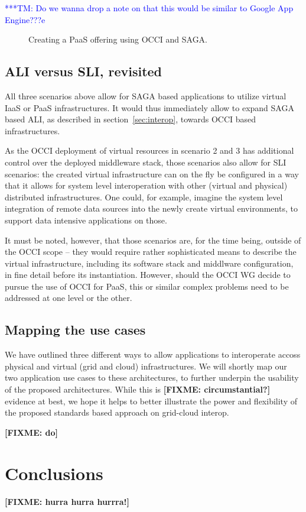 \documentclass[10pt,conference,final,letterpaper,twoside,twocolumn,]{IEEEtran}
\newcommand{\tmnote}[1]{  {\textcolor{blue}    {***TM: #1}}}
\newcommand{\tmnote}[1]{}
\newcommand{\B}[1]{\textbf{#1}}
\newcommand{\F}[1]{\B{[FIXME: #1]}}
\begin{document}
\tmnote{Do we wanna drop a note on that this would be similar to
  Google App Engine???e}

\begin{figure}[htb]
 \caption{\label{fig:arch3} Creating a PaaS offering using OCCI and SAGA.}
\end{figure}

 \subsection{ALI versus SLI, revisited}

 All three scenarios above allow for SAGA based applications to
 utilize virtual IaaS or PaaS infrastructures.  It would thus
 immediately allow to expand SAGA based ALI, as described in
 section~\ref{sec:interop}, towards OCCI based infrastructures.

 As the OCCI deployment of virtual resources in scenario 2 and 3 has
 additional control over the deployed middleware stack, those
 scenarios also allow for SLI scenarios: the created virtual
 infrastructure can on the fly be configured in a way that it allows
 for system level interoperation with other (virtual and physical)
 distributed infrastructures.  One could, for example, imagine the
 system level integration of remote data sources into the newly create
 virtual environments, to support data intensive applications on
 those.

 It must be noted, however, that those scenarios are, for the time
 being, outside of the OCCI scope -- they would require rather
 sophisticated means to describe the virtual infrastructure, including
 its software stack and middlware configuration, in fine detail before
 its instantiation.  However, should the OCCI WG decide to pursue the
 use of OCCI for PaaS, this or similar complex problems need to be
 addressed at one level or the other.


 \subsection{Mapping the use cases}

 We have outlined three different ways to allow applications to
 interoperate accoss physical and virtual (grid and cloud)
 infrastructures.  We will shortly map our two application use cases
 to these architectures, to further underpin the usability of the
 proposed architectures.  While this is \F{circumstantial?} evidence
 at best, we hope it helps to better illustrate the power and
 flexibility of the proposed standards based approach on grid-cloud
 interop.

 \F{do}


\section{Conclusions}
\label{sec:conc}

 \F{hurra hurra hurrra!}




\end{document}
